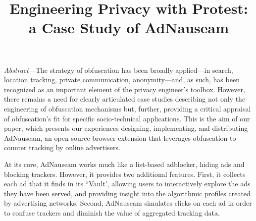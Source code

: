 \documentclass[conference]{IEEEtran}
\begin{document}
\title{Engineering Privacy with Protest:\\a Case Study of AdNauseam}

\author{
\and
{}
}

\maketitle

%
%

%


\emph{Abstract}---The strategy of obfuscation has been broadly applied---in search, location tracking, private communication, anonymity---and, as such, has been recognized as an important element of the privacy engineer's toolbox. However, there remains a need for clearly articulated case studies describing not only the engineering of obfuscation mechanisms but, further, providing a critical appraisal of obfuscation's fit for specific socio-technical applications. This is the aim of our paper, which presents our experiences designing, implementing, and distributing AdNauseam, an open-source browser extension that leverages obfuscation to counter tracking by online advertisers.

At its core, AdNauseam works much like a list-based adblocker, hiding ads and blocking trackers. However, it provides two additional features. First, it collects each ad that it finds in its “Vault', allowing users to interactively explore the ads they have been served, and providing insight into the algorithmic profiles created by advertising networks. Second, AdNauseam simulates clicks on each ad in order to confuse trackers and diminish the value of aggregated tracking data.
\end{document}
